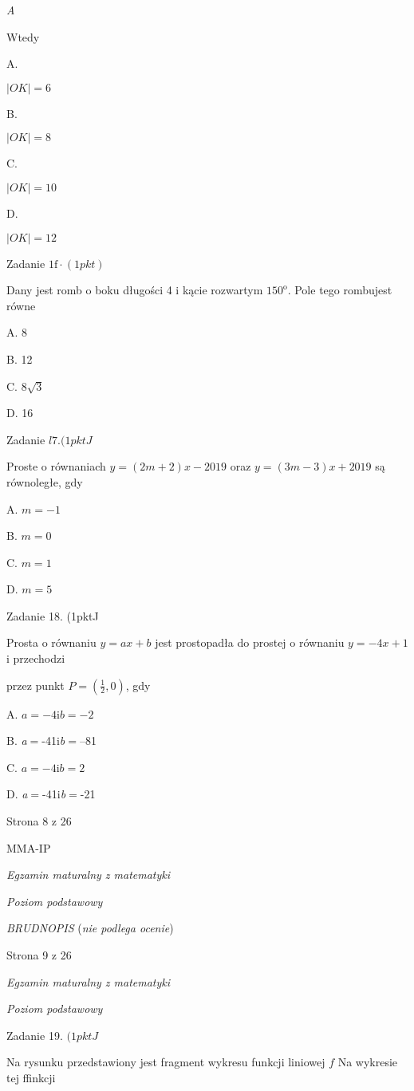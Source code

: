 \documentclass[a4paper,12pt]{article}
\begin{document}
{\it A}

Wtedy

A.

$|OK|=6$

B.

$|OK|=8$

C.

$|OK|=10$

D.

$|OK|=12$

Zadanie $1\mathrm{f}\cdot(1pkt)$

Dany jest romb o boku długości 4 i kącie rozwartym $150^{\mathrm{o}}$. Pole tego rombujest równe

A. 8

B. 12

C. $8\sqrt{3}$

D. 16

Zadanie $l7. (1pktJ$

Proste o równaniach $y=(2m+2)x-2019$ oraz $y=(3m-3)x+2019$ są równoległe, gdy

A. $m=-1$

B. $m=0$

C. $m=1$

D. $m=5$

Zadanie 18. (1pktJ

Prosta o równaniu $y=ax+b$ jest prostopadła do prostej o równaniu $y=-4x+1$ i przechodzi

przez punkt $P=(\displaystyle \frac{1}{2},0)$, gdy

A. $a=-4\mathrm{i}b=-2$

B. {\it a}$=$-41i{\it b}$=$--81

C. $a=-4\mathrm{i}b=2$

D. {\it a}$=$-41i{\it b}$=$-21

Strona 8 z 26

MMA-IP





{\it Egzamin maturalny z matematyki}

{\it Poziom podstawowy}

{\it BRUDNOPIS} ({\it nie podlega ocenie})

Strona 9 z 26





{\it Egzamin maturalny z matematyki}

{\it Poziom podstawowy}

Zadanie 19. $(1pktJ$

Na rysunku przedstawiony jest fragment wykresu funkcji liniowej $f$ Na wykresie tej ffinkcji
\end{document}
